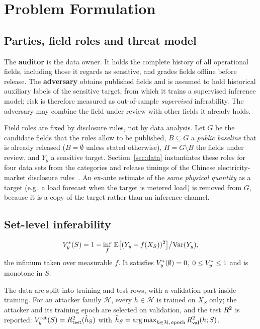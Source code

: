 \section{Problem Formulation}\label{sec:problem}

\subsection{Parties, field roles and threat model}
The \textbf{auditor} is the data owner. It holds the complete history of all operational
fields, including those it regards as sensitive, and grades fields offline before release.
The \textbf{adversary} obtains published fields and is assumed to hold historical auxiliary
labels of the sensitive target, from which it trains a supervised inference model; risk is
therefore measured as out-of-sample \emph{supervised} inferability. The adversary may combine
the field under review with other fields it already holds.

Field roles are fixed by disclosure rules, not by data analysis. Let $G$ be the candidate
fields that the rules allow to be published, $B\subseteq G$ a \emph{public baseline} that is
already released ($B=\emptyset$ unless stated otherwise), $H=G\setminus B$ the fields under
review, and $Y_y$ a sensitive target. Section~\ref{sec:data} instantiates these roles for
four data sets from the categories and release timings of the Chinese electricity-market
disclosure rules~\cite{nea2024disclosure}. An ex-ante estimate of the \emph{same physical
quantity} as a target (e.g.\ a load forecast when the target is metered load) is removed from
$G$, because it is a copy of the target rather than an inference channel.

\subsection{Set-level inferability}
\begin{definition}
\[
V_{y}^{*}(S) = 1 - \inf_{f}\,\mathbb{E}\big[(Y_y - f(X_S))^{2}\big] \big/ \mathrm{Var}(Y_y),
\]
the infimum taken over measurable $f$. It satisfies $V_{y}^{*}(\emptyset)=0$, $0 \le V_{y}^{*} \le 1$
and is monotone in $S$.
\end{definition}

\begin{definition}\label{def:vret}
The data are split into training and test rows, with a validation part inside training. For
an attacker family $\mathcal{H}$, every $h\in\mathcal{H}$ is trained on $X_S$ only; the
attacker and its training epoch are selected on validation, and the test $R^{2}$ is reported:
$V_{y}^{\mathrm{ret}}(S) = R^{2}_{\mathrm{test}}(\hat h_S)$ with
$\hat h_S = \operatorname*{arg\,max}_{h \in \mathcal{H},\,\mathrm{epoch}} R^{2}_{\mathrm{val}}(h;S)$.
\end{definition}

